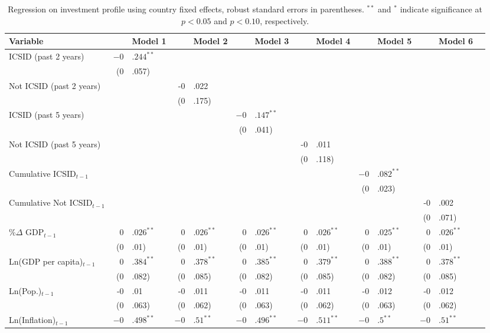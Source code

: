 \begin{enumerate}
\begin{itemize}
			\begin{table}[ht]
			\centering
			\caption{Regression on investment profile using country fixed effects, robust standard errors in parentheses. $^{**}$ and $^{*}$ indicate significance at $p< 0.05 $ and $p< 0.10 $, respectively.} 
			\begingroup\footnotesize
			\begin{tabular}{lr@{} lr@{}lr@{}lr@{} lr@{}lr@{}lr@{}}
			Variable && Model 1 && Model 2 && Model 3 && Model 4 && Model 5 && Model 6 \\ 
			  \hline
			\hline
			ICSID (past 2 years) & $-0$&$.244^{\ast\ast}$ &&  &&  &&  &&  &&  \\ 
			   & (0&.057) &&  &&  &&  &&  &&  \\ 
			  Not ICSID (past 2 years) &&  & -0&.022 && &&  &&  &&  \\ 
			   &  && (0&.175) &&  &&  &&  &&  \\ 
			  ICSID (past 5 years) &  &&  && $-0$&$.147^{\ast\ast}$ &&  &&  &&  \\ 
			   &  &&  && (0&.041) &&  &&  &&  \\ 
			  Not ICSID (past 5 years) &  &&  &&  && -0&.011 &&  &&  \\ 
			   &  &&  &&  && (0&.118) &&  &&  \\ 
			  Cumulative ICSID$_{t-1}$ &  &&  &&  &&  && $-0$&$.082^{\ast\ast}$ &&  \\ 
			   &  &&  &&  &&  && (0&.023) &&  \\ 
			  Cumulative Not ICSID$_{t-1}$ &  &&  &&  &&  &&  && -0&.002 \\ 
			   &  &&  &&  &&  &&  && (0&.071) \\ 
			  \%$\Delta$ GDP$_{t-1}$ & $0$&$.026^{\ast\ast}$ & $0$&$.026^{\ast\ast}$ & $0$&$.026^{\ast\ast}$ & $0$&$.026^{\ast\ast}$ & $0$&$.025^{\ast\ast}$ & $0$&$.026^{\ast\ast}$ \\ 
			   & (0&.01) & (0&.01) & (0&.01) & (0&.01) & (0&.01) & (0&.01) \\ 
			  Ln(GDP per capita)$_{t-1}$ & $0$&$.384^{\ast\ast}$ & $0$&$.378^{\ast\ast}$ & $0$&$.385^{\ast\ast}$ & $0$&$.379^{\ast\ast}$ & $0$&$.388^{\ast\ast}$ & $0$&$.378^{\ast\ast}$ \\ 
			   & (0&.082) & (0&.085) & (0&.082) & (0&.085) & (0&.082) & (0&.085) \\ 
			  Ln(Pop.)$_{t-1}$ & -0&.01 & -0&.011 & -0&.011 & -0&.011 & -0&.012 & -0&.012 \\ 
			   & (0&.063) & (0&.062) & (0&.063) & (0&.062) & (0&.063) & (0&.062) \\ 
			  Ln(Inflation)$_{t-1}$ & $-0$&$.498^{\ast\ast}$ & $-0$&$.51^{\ast\ast}$ & $-0$&$.496^{\ast\ast}$ & $-0$&$.511^{\ast\ast}$ & $-0$&$.5^{\ast\ast}$ & $-0$&$.51^{\ast\ast}$ \\ 

\end{tabular}
\end{table}
\end{itemize}
\end{enumerate}
